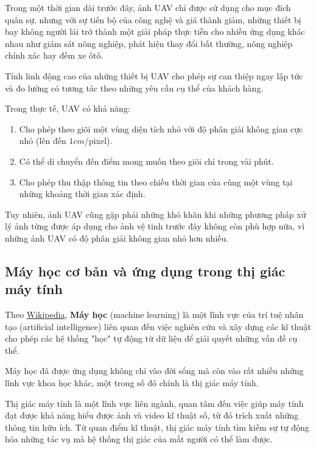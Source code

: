\documentclass[14pt, oneside, a4paper, openany]{scrartcl}
\begin{document}
Trong một thời gian dài trước đây, ảnh UAV chỉ được sử dụng cho mục đích quân sự, nhưng với sự tiến bộ của công nghệ và giá thành giảm, những thiết bị bay không người lái trở thành một giải pháp thực tiễn cho nhiều ứng dụng khác nhau như giám sát nông nghiệp, phát hiện thay đổi bất thường, nông nghiệp chính xác hay đếm xe ôtô.

Tính linh động cao của những thiết bị UAV cho phép sự can thiệp ngay lập tức và đo lường có tương tác theo những yêu cầu cụ thể của khách hàng.

Trong thực tế, UAV có khả năng:
\begin{enumerate}
	\item Cho phép theo giõi một vùng diện tích nhỏ với độ phân giải không gian cực nhỏ (lên đến $1cm$/pixel).
	\item Có thể di chuyển đến điểm mong muốn theo giõi chỉ trong vài phút.
	\item Cho phép thu thập thông tin theo chiều thời gian của cùng một vùng tại những khoảng thời gian xác định.
\end{enumerate}

Tuy nhiên, ảnh UAV cũng gặp phải những khó khăn khi những phương pháp xử lý ảnh từng được áp dụng cho ảnh vệ tinh trước đây không còn phù hợp nữa, vì những ảnh UAV có độ phân giải không gian nhỏ hơn nhiều.

\subsection{Máy học cơ bản và ứng dụng trong thị giác máy tính}
Theo \href{https://vi.wikipedia.org/wiki/H\%E1\%BB\%8Dc_m\%C3\%A1y}{Wikipedia}, \textbf{Máy học}  (machine learning) là một lĩnh vực của trí tuệ nhân tạo (artificial intelligence) liên quan đến việc nghiên cứu và xây dựng các kĩ thuật cho phép các hệ thống "học" tự động từ dữ liệu để giải quyết những vấn đề cụ thể.

Máy học đã được ứng dụng không chỉ vào đời sống mà còn vào rất nhiều những lĩnh vực khoa học khác, một trong số đó chính là thị giác máy tính.

Thị giác máy tính  là một lĩnh vực liên ngành, quan tâm đến việc giúp máy tính đạt được khả năng hiểu được ảnh và video kĩ thuật số, từ đó trích xuất những thông tin hữu ích. Từ quan điểm kĩ thuật, thị giác máy tính tìm kiếm sự tự động hóa những tác vụ mà hệ thống thị giác của mắt người có thể làm được.
\end{document}
